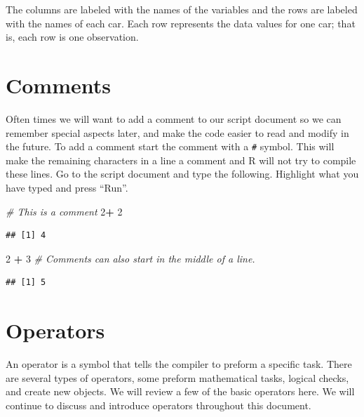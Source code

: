 \documentclass[
]{book}
\newenvironment{Shaded}{\begin{snugshade}}{\end{snugshade}}
\newcommand{\CommentTok}[1]{\textcolor[rgb]{0.56,0.35,0.01}{\textit{#1}}}
\newcommand{\DecValTok}[1]{\textcolor[rgb]{0.00,0.00,0.81}{#1}}
\newcommand{\OperatorTok}[1]{\textcolor[rgb]{0.81,0.36,0.00}{\textbf{#1}}}
\newcommand{\StringTok}[1]{\textcolor[rgb]{0.31,0.60,0.02}{#1}}
\begin{document}
The columns are labeled with the names of the variables and the rows are labeled with the names of each car. Each row represents the data values for one car; that is, each row is one observation.

\hypertarget{comments}{%
\section{Comments}\label{comments}}

Often times we will want to add a comment to our script document so we can remember special aspects later, and make the code easier to read and modify in the future. To add a comment start the comment with a \texttt{\#} symbol. This will make the remaining characters in a line a comment and R will not try to compile these lines. Go to the script document and type the following. Highlight what you have typed and press ``Run''.

\begin{Shaded}
\begin{Highlighting}[]
\CommentTok{# This is a comment }
\DecValTok{2}\OperatorTok{+}\StringTok{ }\DecValTok{2}
\end{Highlighting}
\end{Shaded}

\begin{verbatim}
## [1] 4
\end{verbatim}

\begin{Shaded}
\begin{Highlighting}[]
\DecValTok{2} \OperatorTok{+}\StringTok{ }\DecValTok{3} \CommentTok{# Comments can also start in the middle of a line. }
\end{Highlighting}
\end{Shaded}

\begin{verbatim}
## [1] 5
\end{verbatim}

\hypertarget{operators}{%
\section{Operators}\label{operators}}

An operator is a symbol that tells the compiler to preform a specific task. There are several types of operators, some preform mathematical tasks, logical checks, and create new objects. We will review a few of the basic operators here. We will continue to discuss and introduce operators throughout this document.
\end{document}
